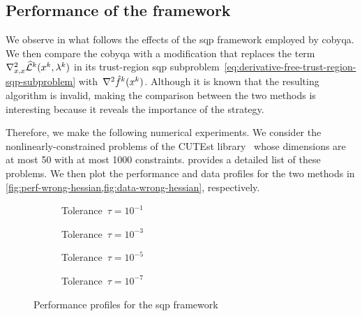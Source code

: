 \subsection{Performance of the  framework}

We observe in what follows the effects of the \gls{sqp} framework employed by \gls{cobyqa}.
We then compare the \gls{cobyqa} with a modification that replaces the term~$\nabla_{x, x}^2 \lagm[k](\iter[k], \lm[k])$ in its trust-region \gls{sqp} subproblem~\cref{eq:derivative-free-trust-region-sqp-subproblem} with~$\nabla^2 \objm[k](\iter[k])$.
Although it is known that the resulting algorithm is invalid, making the comparison between the two methods is interesting because it reveals the importance of the strategy.

Therefore, we make the following numerical experiments.
We consider the nonlinearly-constrained problems of the CUTEst library~\cite{Gould_Orban_Toint_2015} whose dimensions are at most \num{50} with at most \num[group-minimum-digits=4]{1000} constraints.
 provides a detailed list of these problems.
We then plot the performance and data profiles for the two methods in \cref{fig:perf-wrong-hessian,fig:data-wrong-hessian}, respectively.

\begin{figure}[ht]
    \centering
    \begin{subfigure}[b]{0.49\textwidth}
        \centering
        \caption{Tolerance~$\tau = 10^{-1}$}
    \end{subfigure}
    \hfill
    \begin{subfigure}[b]{0.49\textwidth}
        \centering
        \caption{Tolerance~$\tau = 10^{-3}$}
    \end{subfigure}
    \begin{subfigure}[b]{0.49\textwidth}
        \centering
        \caption{Tolerance~$\tau = 10^{-5}$}
    \end{subfigure}
    \hfill
    \begin{subfigure}[b]{0.49\textwidth}
        \centering
        \caption{Tolerance~$\tau = 10^{-7}$}
    \end{subfigure}
    \caption{Performance profiles for the \gls{sqp} framework}
    \label{fig:perf-wrong-hessian}
\end{figure}

